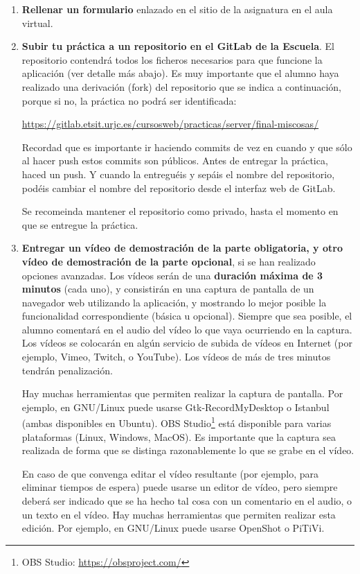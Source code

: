 \begin{enumerate}

  \item {\bf Rellenar un formulario} enlazado en el sitio de la asignatura en el aula virtual.
  
  \item {\bf Subir tu práctica a un repositorio en el GitLab de la Escuela}. El repositorio contendrá todos los ficheros necesarios para que funcione la aplicación (ver detalle más abajo). Es muy importante que el alumno haya realizado una derivación (fork) del repositorio que se indica a continuación, porque si no, la práctica no podrá ser identificada: 

\url{https://gitlab.etsit.urjc.es/cursosweb/practicas/server/final-miscosas/}

Recordad que es importante ir haciendo commits de vez en cuando y que sólo al hacer push estos commits son públicos. Antes de entregar la práctica, haced un push. Y cuando la entreguéis y sepáis el nombre del repositorio, podéis cambiar el nombre del repositorio desde el interfaz web de GitLab. 

Se recomeinda mantener el repositorio como privado, hasta el momento en que se entregue la práctica.

 \item {\bf Entregar un vídeo de demostración de la parte obligatoria, y otro vídeo de demostración de la parte opcional}, si se han realizado opciones avanzadas. Los vídeos serán de una {\bf duración máxima de 3 minutos} (cada uno), y consistirán en una captura de pantalla de un navegador web utilizando la aplicación, y mostrando lo mejor posible la funcionalidad correspondiente (básica u opcional). Siempre que sea posible, el alumno comentará en el audio del vídeo lo que vaya ocurriendo en la captura. Los vídeos se colocarán en algún servicio de subida de vídeos en Internet (por ejemplo, Vimeo, Twitch, o YouTube). Los vídeos de más de tres minutos tendrán penalización.

Hay muchas herramientas que permiten realizar la captura de pantalla. Por ejemplo, en GNU/Linux puede usarse Gtk-RecordMyDesktop o Istanbul (ambas disponibles en Ubuntu). OBS Studio\footnote{OBS Studio: \url{https://obsproject.com/}} está disponible para varias plataformas (Linux, Windows, MacOS). Es importante que la captura sea realizada de forma que se distinga razonablemente lo que se grabe en el vídeo.

En caso de que convenga editar el vídeo resultante (por ejemplo, para eliminar tiempos de espera) puede usarse un editor de vídeo, pero siempre deberá ser indicado que se ha hecho tal cosa con un comentario en el audio, o un texto en el vídeo. Hay muchas herramientas que permiten realizar esta edición. Por ejemplo, en GNU/Linux puede usarse OpenShot o PiTiVi.

\end{enumerate}

